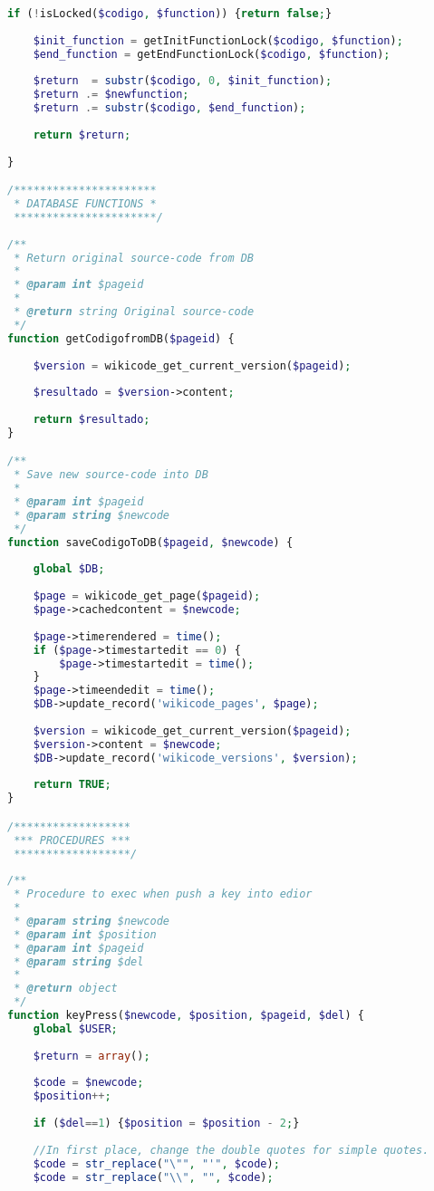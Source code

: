 \begin{lstlisting}[language=PHP]
	if (!isLocked($codigo, $function)) {return false;}
	
	$init_function = getInitFunctionLock($codigo, $function);
	$end_function = getEndFunctionLock($codigo, $function);
	
	$return  = substr($codigo, 0, $init_function);
	$return .= $newfunction;
	$return .= substr($codigo, $end_function);
	
	return $return;
	
}

/**********************
 * DATABASE FUNCTIONS *
 **********************/
 
/**
 * Return original source-code from DB
 * 
 * @param int $pageid
 * 
 * @return string Original source-code
 */
function getCodigofromDB($pageid) {
	
	$version = wikicode_get_current_version($pageid);
	
	$resultado = $version->content;
	
	return $resultado;
}

/**
 * Save new source-code into DB
 * 
 * @param int $pageid
 * @param string $newcode
 */
function saveCodigoToDB($pageid, $newcode) {
	
	global $DB;
	
	$page = wikicode_get_page($pageid);
	$page->cachedcontent = $newcode;
	
	$page->timerendered = time();
	if ($page->timestartedit == 0) {
		$page->timestartedit = time();
	}
	$page->timeendedit = time();
	$DB->update_record('wikicode_pages', $page);
	
	$version = wikicode_get_current_version($pageid);
	$version->content = $newcode;
	$DB->update_record('wikicode_versions', $version);
	
	return TRUE;
}

/******************
 *** PROCEDURES ***
 ******************/
 
/**
 * Procedure to exec when push a key into edior
 * 
 * @param string $newcode
 * @param int $position
 * @param int $pageid
 * @param string $del
 * 
 * @return object
 */
function keyPress($newcode, $position, $pageid, $del) {
	global $USER;
	
	$return = array();
	
	$code = $newcode;
	$position++;
	
	if ($del==1) {$position = $position - 2;}
	
	//In first place, change the double quotes for simple quotes.
	$code = str_replace("\"", "'", $code);
    $code = str_replace("\\", "", $code);
	

\end{lstlisting}
